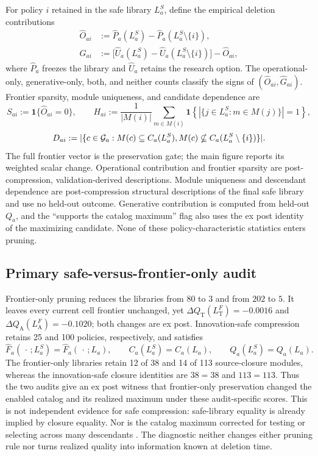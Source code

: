 For policy \(i\) retained in the safe library \(L_a^S\), define the empirical
deletion contributions
\begin{align}
  \widehat O_{ai}
    &:=\widehat P_a(L_a^S)-\widehat P_a(L_a^S\setminus\{i\}),\nonumber\\
  \widehat G_{ai}
    &:={}
      \bigl[\widehat U_a(L_a^S)
       -\widehat U_a(L_a^S\setminus\{i\})\bigr]-\widehat O_{ai},
  \label{eq:supp-financial-policy-contributions}
\end{align}
where \(\widehat P_a\) freezes the library and \(\widehat U_a\) retains the
research option.  The operational-only, generative-only, both, and neither
counts classify the signs of \((\widehat O_{ai},\widehat G_{ai})\).  Frontier
sparsity, module uniqueness, and candidate dependence are
\[
 S_{ai}:=\mathbf 1\{\widehat O_{ai}=0\},\qquad
 H_{ai}:=\frac{1}{|M(i)|}\sum_{m\in M(i)}
   \mathbf 1\!\left\{|\{j\in L_a^S:m\in M(j)\}|=1\right\},
\]
\[
 D_{ai}:=
 |\{c\in\mathcal G_a:
   M(c)\subseteq C_a(L_a^S),\\
   M(c)\nsubseteq C_a(L_a^S\setminus\{i\})\}|.
\]
The full frontier vector is the preservation gate; the main figure reports
its weighted scalar change.  Operational contribution and frontier sparsity
are post-compression, validation-derived descriptions.  Module uniqueness
and descendant dependence are post-compression structural descriptions of the
final safe library and use no held-out outcome.  Generative contribution is
computed from held-out \(Q_a\), and the ``supports the catalog maximum'' flag also
uses the ex post identity of the maximizing candidate.  None of these
policy-characteristic statistics enters pruning.

\subsection{Primary safe-versus-frontier-only audit}

Frontier-only pruning reduces the libraries from \(80\) to \(3\) and from
\(202\) to \(5\).  It leaves every current cell frontier unchanged, yet
\(\Delta Q_{\mathrm T}(L_{\mathrm T}^F)=-0.0016\) and
\(\Delta Q_{\mathrm A}(L_{\mathrm A}^F)=-0.1020\); both changes are ex post.
Innovation-safe compression retains 25 and 100 policies, respectively, and
satisfies
\[
  \widehat F_a(\,\cdot\,;L_a^S)=\widehat F_a(\,\cdot\,;L_a),\qquad
  C_a(L_a^S)=C_a(L_a),\qquad
  Q_a(L_a^S)=Q_a(L_a).
\]
The frontier-only libraries retain 12 of 38 and 14 of 113 source-closure
modules, whereas the innovation-safe closure identities are \(38=38\) and
\(113=113\). Thus the two audits give an ex post witness that frontier-only
preservation changed the enabled catalog and its realized maximum under these
audit-specific scores. This is not independent evidence for safe compression:
safe-library equality is already implied by closure equality. Nor is the
catalog maximum corrected for testing or selecting across many descendants
\citep{SullivanTimmermannWhite1999,White2000,HarveyLiuZhu2016}. The diagnostic
neither changes either pruning rule nor turns realized quality into information
known at deletion time.

